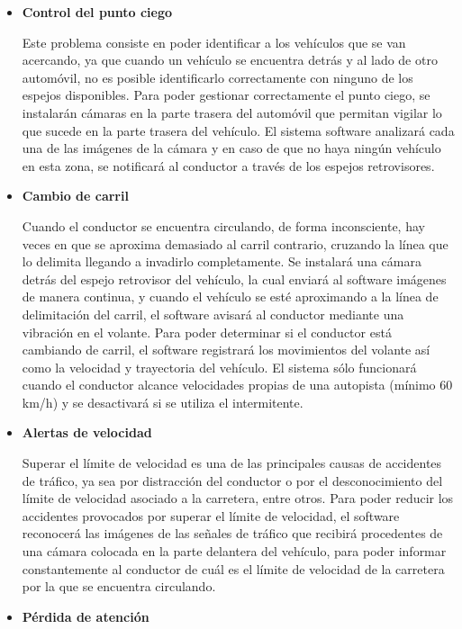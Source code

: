 \begin{itemize}[-]
\item \textbf{Control del punto ciego}
\par Este problema consiste en poder identificar a los vehículos que se van acercando, ya que cuando un vehículo se encuentra detrás y al lado de otro automóvil, no es posible identificarlo correctamente con ninguno de los espejos disponibles. Para poder gestionar correctamente el punto ciego, se instalarán cámaras en la parte trasera del automóvil que permitan vigilar lo que sucede en la parte trasera del vehículo. El sistema software analizará cada una de las imágenes de la cámara y en caso de que no haya ningún vehículo en esta zona, se notificará al conductor a través de los espejos retrovisores. 
\item \textbf{Cambio de carril}
\par Cuando el conductor se encuentra circulando, de forma inconsciente, hay veces en que se aproxima demasiado al carril contrario, cruzando la línea que lo delimita llegando a invadirlo completamente. Se instalará una cámara detrás del espejo retrovisor del vehículo, la cual enviará al software imágenes de manera continua, y cuando el vehículo se esté aproximando a la línea de delimitación del carril, el software avisará al conductor mediante una vibración en el volante. Para poder determinar si el conductor está cambiando de carril, el software registrará los movimientos del volante así como la velocidad y trayectoria del vehículo. El sistema sólo funcionará cuando el conductor alcance velocidades propias de una autopista (mínimo 60 km/h) y se desactivará si se utiliza el intermitente.
\item \textbf{Alertas de velocidad}
\par Superar el límite de velocidad es una de las principales causas de accidentes de tráfico, ya sea por distracción del conductor o por el desconocimiento del límite de velocidad asociado a la carretera, entre otros. Para poder reducir los accidentes provocados por superar el límite de velocidad, el software reconocerá las imágenes de las señales de tráfico que recibirá procedentes de una cámara colocada en la parte delantera del vehículo, para poder informar constantemente al conductor de cuál es el límite de velocidad de la carretera por la que se encuentra circulando.
\item \textbf{Pérdida de atención}

\end{itemize}
